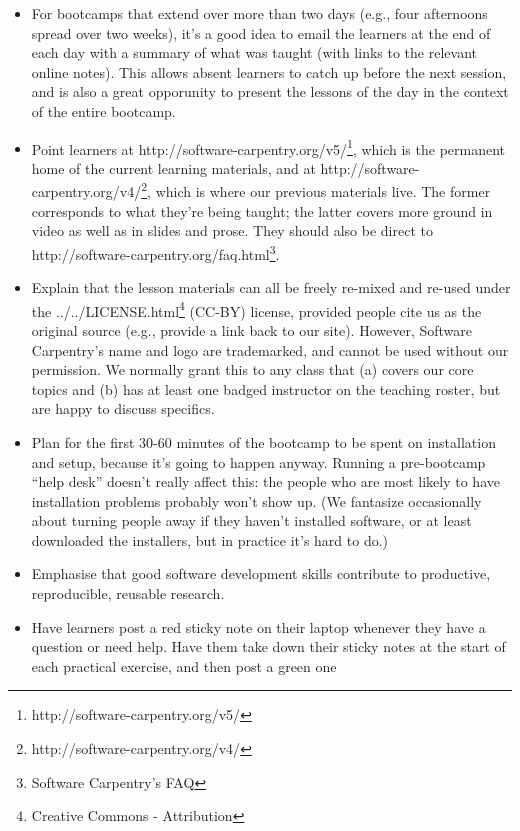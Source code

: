 \documentclass[]{book}
\newcommand{\urlfoot}[2]{{#1}\footnote{#2}}
\begin{document}
\begin{itemize}
\item
  For bootcamps that extend over more than two days (e.g., four
  afternoons spread over two weeks), it's a good idea to email the
  learners at the end of each day with a summary of what was taught
  (with links to the relevant online notes). This allows absent learners
  to catch up before the next session, and is also a great opporunity to
  present the lessons of the day in the context of the entire bootcamp.
\item
  Point learners at
  \urlfoot{http://software-carpentry.org/v5/}{http://software-carpentry.org/v5/},
  which is the permanent home of the current learning materials, and at
  \urlfoot{http://software-carpentry.org/v4/}{http://software-carpentry.org/v4/},
  which is where our previous materials live. The former corresponds to
  what they're being taught; the latter covers more ground in video as
  well as in slides and prose. They should also be direct to
  \urlfoot{http://software-carpentry.org/faq.html}{Software Carpentry's
  FAQ}.
\item
  Explain that the lesson materials can all be freely re-mixed and
  re-used under the \urlfoot{../../LICENSE.html}{Creative Commons -
  Attribution} (CC-BY) license, provided people cite us as the original
  source (e.g., provide a link back to our site). However, Software
  Carpentry's name and logo are trademarked, and cannot be used without
  our permission. We normally grant this to any class that (a) covers
  our core topics and (b) has at least one badged instructor on the
  teaching roster, but are happy to discuss specifics.
\item
  Plan for the first 30-60 minutes of the bootcamp to be spent on
  installation and setup, because it's going to happen anyway. Running a
  pre-bootcamp ``help desk'' doesn't really affect this: the people who
  are most likely to have installation problems probably won't show up.
  (We fantasize occasionally about turning people away if they haven't
  installed software, or at least downloaded the installers, but in
  practice it's hard to do.)
\item
  Emphasise that good software development skills contribute to
  productive, reproducible, reusable research.
\item
  Have learners post a red sticky note on their laptop whenever they
  have a question or need help. Have them take down their sticky notes
  at the start of each practical exercise, and then post a green one

\end{itemize}
\end{document}
